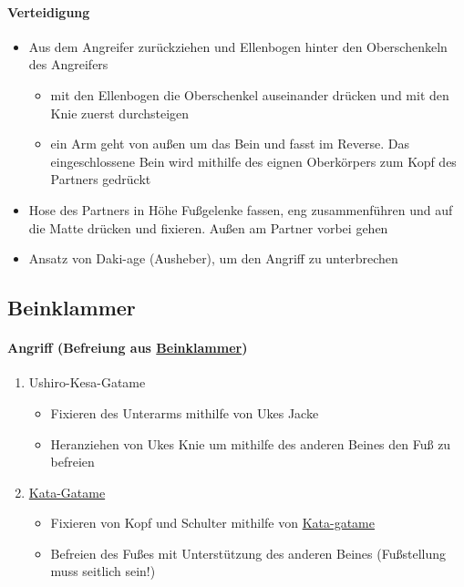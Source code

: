 \documentclass[justified, a4paper, notitlepage, captions=tableheading, nobib]{tufte-handout}
\begin{document}
\paragraph{Verteidigung}
\label{sec:org9855ca2}
\begin{itemize}
\item Aus dem Angreifer zurückziehen und Ellenbogen hinter den Oberschenkeln des Angreifers
\begin{itemize}
\item mit den Ellenbogen die Oberschenkel auseinander drücken und mit den Knie zuerst durchsteigen
\item ein Arm geht von außen um das Bein und fasst im Reverse. Das eingeschlossene Bein wird mithilfe des eignen Oberkörpers zum Kopf des Partners gedrückt
\end{itemize}
\item Hose des Partners in Höhe Fußgelenke fassen, eng zusammenführen und auf die Matte drücken und fixieren. Außen am Partner vorbei gehen
\item Ansatz von Daki-age (Ausheber), um den Angriff zu unterbrechen
\end{itemize}


\subsection{\label{org36bef7c}Beinklammer }
\label{sec:orgb86f394}
\paragraph{Angriff (Befreiung aus \hyperref[org36bef7c]{Beinklammer})}
\label{sec:orge2ee717}
\begin{enumerate}
\item Ushiro-Kesa-Gatame
\begin{itemize}
\item Fixieren des Unterarms mithilfe von Ukes Jacke
\item Heranziehen von Ukes Knie um mithilfe des anderen Beines den Fuß zu befreien
\end{itemize}
\item \hyperref[orga0a7671]{Kata-Gatame}
\begin{itemize}
\item Fixieren von Kopf und Schulter mithilfe von \hyperref[orga0a7671]{Kata-gatame}
\item Befreien des Fußes mit Unterstützung des anderen Beines (Fußstellung muss seitlich sein!)
\end{itemize}
\end{enumerate}
\end{document}
